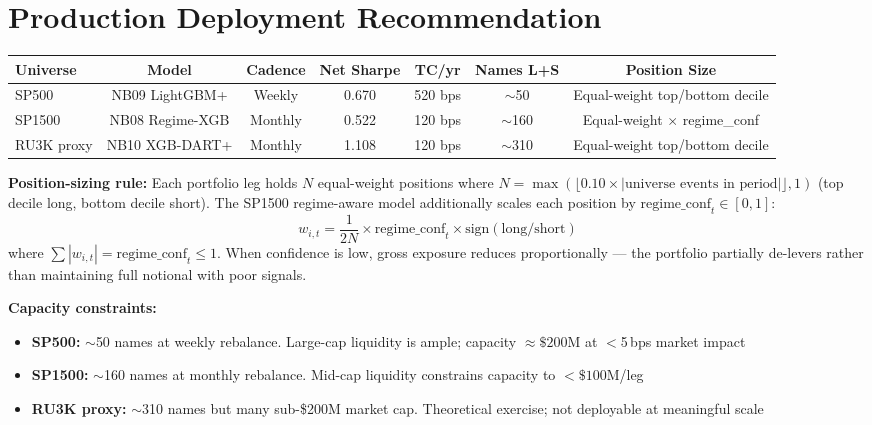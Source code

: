 \documentclass[11pt,a4paper]{article}
\begin{document}
\section{Production Deployment Recommendation}

\begin{center}
\begin{tabular}{lcccccc}
\toprule
\textbf{Universe} & \textbf{Model} & \textbf{Cadence} & \textbf{Net Sharpe} & \textbf{TC/yr} & \textbf{Names L+S} & \textbf{Position Size}\\
\midrule
SP500      & NB09 LightGBM+  & Weekly  & 0.670 & 520 bps & $\sim$50  & Equal-weight top/bottom decile\\
SP1500     & NB08 Regime-XGB & Monthly & 0.522 & 120 bps & $\sim$160 & Equal-weight $\times$ regime\_conf\\
RU3K proxy & NB10 XGB-DART+  & Monthly & 1.108 & 120 bps & $\sim$310 & Equal-weight top/bottom decile\\
\bottomrule
\end{tabular}
\end{center}

\textbf{Position-sizing rule:} Each portfolio leg holds $N$ equal-weight positions where $N = \max(\lfloor 0.10 \times |\text{universe events in period}|\rfloor, 1)$ (top decile long, bottom decile short). The SP1500 regime-aware model additionally scales each position by $\text{regime\_conf}_t \in [0,1]$:
\[
w_{i,t} = \frac{1}{2N} \times \text{regime\_conf}_t \times \text{sign}(\text{long/short})
\]
where $\sum |w_{i,t}| = \text{regime\_conf}_t \le 1$. When confidence is low, gross exposure reduces proportionally --- the portfolio partially de-levers rather than maintaining full notional with poor signals.

\textbf{Capacity constraints:}
\begin{itemize}[nosep]
  \item \textbf{SP500:} $\sim$50 names at weekly rebalance. Large-cap liquidity is ample; capacity $\approx \$200$M at $<$5\,bps market impact
  \item \textbf{SP1500:} $\sim$160 names at monthly rebalance. Mid-cap liquidity constrains capacity to $<\$100$M/leg
  \item \textbf{RU3K proxy:} $\sim$310 names but many sub-\$200M market cap. Theoretical exercise; not deployable at meaningful scale
\end{itemize}
\end{document}
